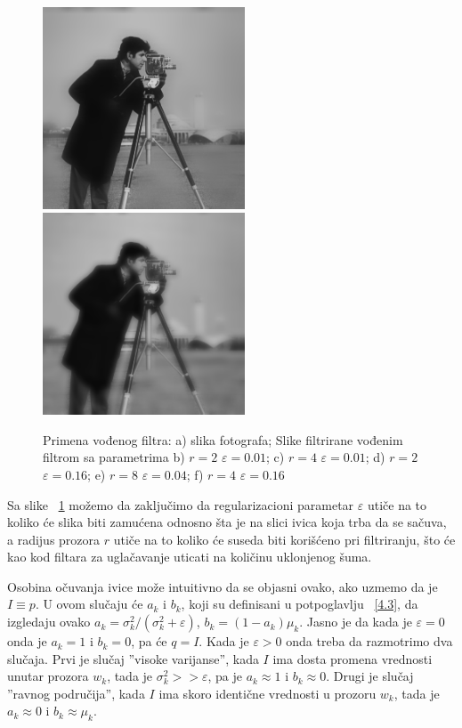 \documentclass[a4paper,12pt,titlepage]{article}
\begin{document}
\begin{figure}[ht!]
\includegraphics[width=60mm]{img/imgGF8_04.png}
\includegraphics[width=60mm]{img/imgGF4_16.png}
\caption{Primena vođenog filtra: a) slika fotografa; Slike filtrirane vođenim filtrom sa parametrima b) $r = 2$ $\varepsilon = 0.01$; c) $r = 4$ $\varepsilon = 0.01$; d) $r = 2$ $\varepsilon = 0.16$; e) $r = 8$ $\varepsilon = 0.04$; f) $r = 4$ $\varepsilon = 0.16$}
\label{gfilter}
\end{figure}

Sa slike ~\ref{gfilter} možemo da zaključimo da regularizacioni parametar $\varepsilon$ utiče na to koliko će slika biti zamućena odnosno šta je na slici ivica koja trba da se sačuva, a radijus prozora $r$ utiče na to koliko će suseda biti korišćeno pri filtriranju, što će kao kod filtara za uglačavanje uticati na količinu uklonjenog šuma. 

Osobina očuvanja ivice može intuitivno da se objasni ovako, ako uzmemo da je $I \equiv p$. U ovom slučaju će $a_k$ i $b_k$, koji su definisani u potpoglavlju ~\ref{4.3}, da izgledaju ovako $a_k = \sigma_k^2 / (\sigma_k^2 + \varepsilon)$, $b_k = (1 - a_k)\mu_k$. Jasno je da kada je $\varepsilon = 0$ onda je $a_k = 1$ i $b_k = 0$, pa će $q = I$. Kada je $\varepsilon > 0$ onda treba da razmotrimo dva slučaja. Prvi je slučaj ''visoke varijanse'', kada $I$ ima dosta promena vrednosti unutar prozora $w_k$, tada je $\sigma_k^2 >> \varepsilon$, pa je $a_k \approx 1$ i $b_k \approx 0$. Drugi je slučaj ''ravnog područija'', kada $I$ ima skoro identične vrednosti u prozoru $w_k$, tada je $a_k \approx 0$ i $b_k \approx \mu_k$. 
\end{document}
